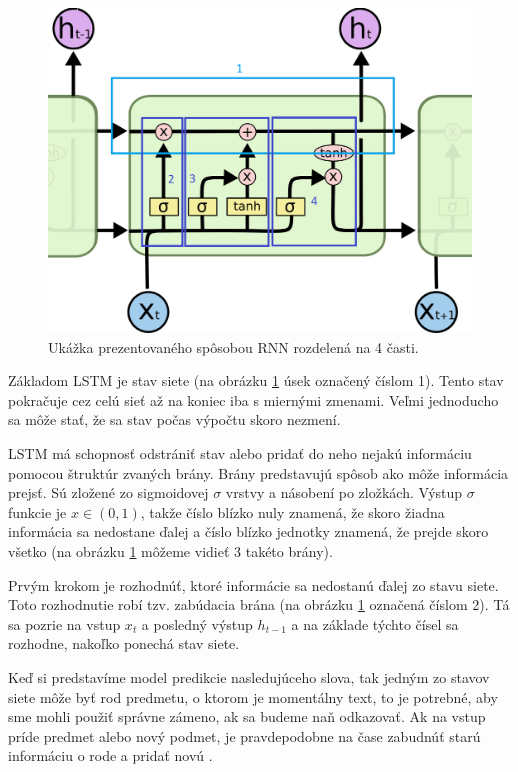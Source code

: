 \begin{figure} [h!]
\includegraphics[width=\textwidth]{../img/lstm-close.png}
\caption{Ukážka prezentovaného spôsobou RNN rozdelená na 4 časti.}
\label{lstm:close}
\end{figure}

Základom LSTM je stav siete (na obrázku \ref{lstm:close} úsek označený číslom 1).
Tento stav pokračuje cez celú sieť až na koniec iba s miernými zmenami.
Veľmi jednoducho sa môže stať, že sa stav počas výpočtu skoro nezmení.


LSTM má schopnosť odstrániť stav alebo pridať do neho nejakú informáciu pomocou štruktúr zvaných brány. Brány predstavujú spôsob ako môže informácia prejsť. 
Sú zložené zo sigmoidovej $\sigma$ vrstvy a násobení po zložkách. Výstup $\sigma$ funkcie je $x \in (0,1)$, takže číslo blízko nuly znamená, že skoro žiadna informácia sa nedostane ďalej a číslo blízko jednotky znamená, že prejde skoro všetko (na obrázku \ref{lstm:close} môžeme vidieť 3 takéto brány).

Prvým krokom je rozhodnúť, ktoré informácie sa nedostanú ďalej zo stavu siete. Toto rozhodnutie robí tzv. zabúdacia brána (na obrázku \ref{lstm:close} označená číslom 2). Tá sa pozrie na vstup $x_t$ a posledný výstup $h_{t-1}$ a na základe týchto čísel sa rozhodne, nakoľko ponechá stav siete.

Keď si predstavíme model predikcie nasledujúceho slova, tak jedným zo stavov siete môže byť rod predmetu, o ktorom je momentálny text, to je potrebné, aby sme mohli použiť správne zámeno, ak sa budeme naň odkazovať. Ak na vstup príde predmet alebo nový podmet, je pravdepodobne na čase zabudnúť starú informáciu o rode a pridať novú \citep{rnn:colah}.

